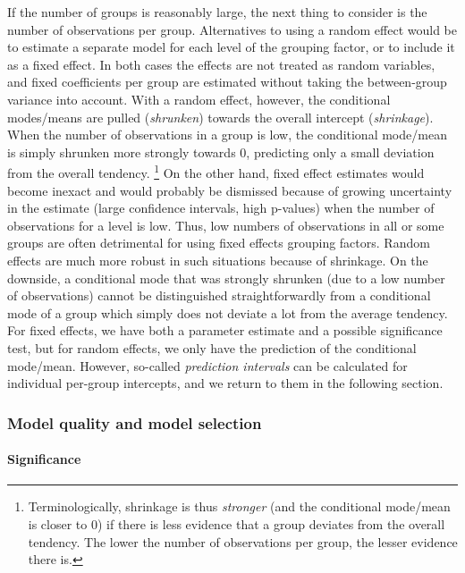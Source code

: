 If the number of groups is reasonably large, the next thing to consider is the number of observations per group.
Alternatives to using a random effect would be to estimate a separate model for each level of the grouping factor, or to include it as a fixed effect.
In both cases the effects are not treated as random variables, and fixed coefficients per group are estimated without taking the between-group variance into account.
With a random effect, however, the conditional modes\slash means are pulled (\textit{shrunken}) towards the overall intercept (\textit{shrinkage}).
When the number of observations in a group is low, the conditional mode\slash mean is simply shrunken more strongly towards $0$, predicting only a small deviation from the overall tendency.%
\footnote{Terminologically, shrinkage is thus \textit{stronger} (and the conditional mode\slash mean is closer to $0$) if there is less evidence that a group deviates from the overall tendency.
The lower the number of observations per group, the lesser evidence there is.}
On the other hand, fixed effect estimates would become inexact and would probably be dismissed because of growing uncertainty in the estimate (large confidence intervals, high p-values) when the number of observations for a level is low.
Thus, low numbers of observations in all or some groups are often detrimental for using fixed effects grouping factors.
Random effects are much more robust in such situations because of shrinkage.
On the downside, a conditional mode that was strongly shrunken (due to a low number of observations) cannot be distinguished straightforwardly from a conditional mode of a group which simply does not deviate a lot from the average tendency.
For fixed effects, we have both a parameter estimate and a possible significance test, but for random effects, we only have the prediction of the conditional mode\slash mean.
However, so-called \textit{prediction intervals} can be calculated for individual per-group intercepts, and we return to them in the following section.


\subsubsection{Model quality and model selection}
\label{sec:significancetestingandcoefficientsofdetermination}

\paragraph{Significance}

